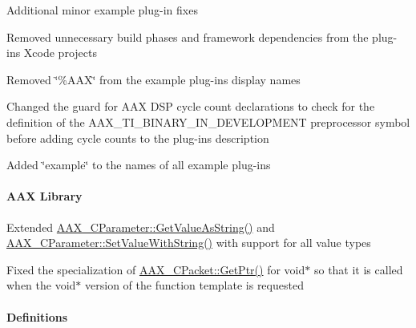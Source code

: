 \begin{DoxyItemize}
\item Additional minor example plug-\/in fixes 
\begin{DoxyItemize}
\item Removed unnecessary build phases and framework dependencies from the plug-\/ins\textquotesingle{} Xcode projects 
\item Removed \char`\"{}\%\+A\+A\+X\char`\"{} from the example plug-\/ins\textquotesingle{} display names 
\item Changed the guard for A\+AX D\+SP cycle count declarations to check for the definition of the {\ttfamily A\+A\+X\+\_\+\+T\+I\+\_\+\+B\+I\+N\+A\+R\+Y\+\_\+\+I\+N\+\_\+\+D\+E\+V\+E\+L\+O\+P\+M\+E\+NT} preprocessor symbol before adding cycle counts to the plug-\/in\textquotesingle{}s description 
\item Added \char`\"{}example\char`\"{} to the names of all example plug-\/ins 
\end{DoxyItemize}
\end{DoxyItemize}\hypertarget{a00847_aax_sdk_2p2p1_AAX_Library}{}\paragraph{A\+A\+X Library}\label{a00847_aax_sdk_2p2p1_AAX_Library}

\begin{DoxyItemize}
\item Extended \mbox{\hyperlink{a01537_a7c5e951eb4c32b2993048acb414adc52}{A\+A\+X\+\_\+\+C\+Parameter\+::\+Get\+Value\+As\+String()}} and \mbox{\hyperlink{a01537_a0304e07f471e1a9dd804bbba7940281e}{A\+A\+X\+\_\+\+C\+Parameter\+::\+Set\+Value\+With\+String()}} with support for all value types 
\item Fixed the specialization of \mbox{\hyperlink{a01513_a4f9bbeedcad126dd34e797ac4c8fc736}{A\+A\+X\+\_\+\+C\+Packet\+::\+Get\+Ptr()}} for {\ttfamily void$\ast$} so that it is called when the {\ttfamily void$\ast$} version of the function template is requested 
\end{DoxyItemize}\hypertarget{a00847_aax_sdk_2p2p1_Definitions}{}\paragraph{Definitions}\label{a00847_aax_sdk_2p2p1_Definitions}

